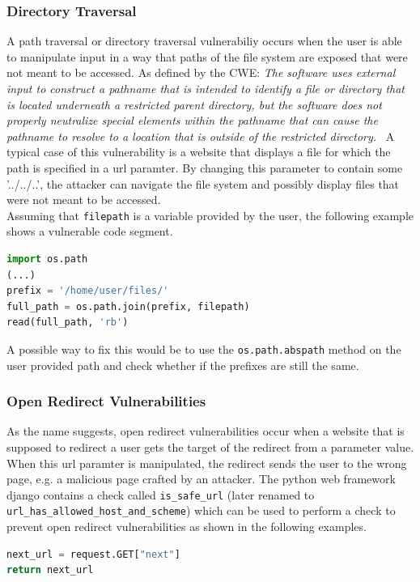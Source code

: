 \documentclass[
	a4paper,
	pagesize,
	pdftex,
	12pt,
	twoside, %
	BCOR=5mm, %
	ngerman,
	fleqn,
	final,
	]{scrartcl}
\begin{document}
\subsubsection{Directory Traversal}
A path traversal or directory traversal vulnerabiliy occurs when the user is able to manipulate input in a way that paths of the file system are exposed that were not meant to be accessed. 
As defined by the CWE: \textit{The software uses external input to construct a pathname that is intended to identify a file or directory that is located underneath a restricted parent directory, but the software does not properly neutralize special elements within the pathname that can cause the pathname to resolve to a location that is outside of the restricted directory.}~\cite{CommonWeaknessEnumeration.19.9.2019c}  A typical case of this vulnerability is a website that displays a file for which the path is specified in a url paramter. By changing this parameter to contain some '../../..', the attacker can navigate the file system and possibly display files that were not meant to be accessed.\\
Assuming that \texttt{filepath} is a variable provided by the user, the following example shows a vulnerable code segment.
\begin{lstlisting}[language=Python, showstringspaces=False]
import os.path
(...)
prefix = '/home/user/files/'
full_path = os.path.join(prefix, filepath)
read(full_path, 'rb')
\end{lstlisting}
A possible way to fix this would be to use the \texttt{os.path.abspath} method on the user provided path and check whether if the prefixes are still the same. 



\subsubsection{Open Redirect Vulnerabilities}
As the name suggests, open redirect vulnerabilities occur when a website that is supposed to redirect a user gets the target of the redirect from a parameter value. When this url paramter is manipulated, the redirect sends the user to the wrong page, e.g. a malicious page crafted by an attacker. The python web framework django contains a check called \texttt{is\_safe\_url} (later renamed to \texttt{url\_has\_allowed\_host\_and\_scheme}) which can be used to perform a check to prevent open redirect vulnerabilities as shown in the following examples.

\begin{lstlisting}[language=Python, showstringspaces=False]
next_url = request.GET["next"]
return next_url
\end{lstlisting}
\end{document}
